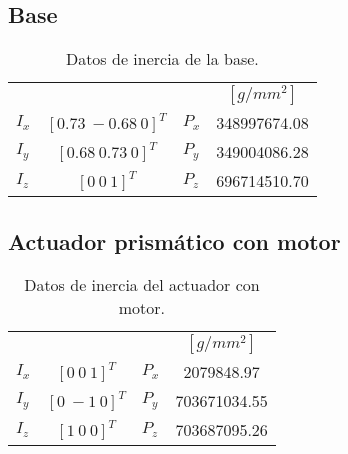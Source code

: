 \subsection{Base}

% 

\begin{table}[hb!]
 \begin{center}
\begin{tabular}{lclc}
 & & & $[g/mm^2]$\\
 $ I_x $ & $ [0.73\ -0.68\ 0]^T $ & $ P_x $ & 348997674.08\\
 $ I_y $ & $ [0.68\ 0.73\ 0]^T $ & $ P_y $ & 349004086.28\\
 $ I_z $ & $ [0 \ 0 \ 1]^T $ & $ P_z $ & 696714510.70
\end{tabular}
\end{center}
\caption{Datos de inercia de la base.}
\label{tab: inertia table base}
\end{table}

\subsection{Actuador prismático con motor}
\begin{table}[hb!]
 \begin{center}
\begin{tabular}{lclc}

% 


 & & & $[g/mm^2]$\\
 $ I_x $ & $ [0 \ 0 \ 1]^T $ & $ P_x $ & 2079848.97\\
 $ I_y $ & $ [0 \ -1 \ 0]^T $ & $ P_y $ & 703671034.55\\
 $ I_z $ & $ [1 \ 0 \ 0]^T $ & $ P_z $ & 703687095.26
\end{tabular}
\end{center}
\caption{Datos de inercia del actuador con motor.}
\label{tab: inertia table motor}
\end{table}

